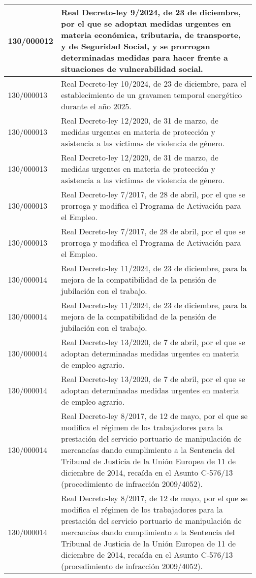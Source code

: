 {\begin{table}[H]
\begin{center}
\begin{tabularx}{\linewidth}{| l | X |}
\hline
130/000012 & Real Decreto-ley 9/2024, de 23 de diciembre, por el que se adoptan medidas urgentes en materia económica, tributaria, de transporte, y de Seguridad Social, y se prorrogan determinadas medidas para hacer frente a situaciones de vulnerabilidad social. \\
\hline
130/000013 & Real Decreto-ley 10/2024, de 23 de diciembre, para el establecimiento de un gravamen temporal energético durante el año 2025. \\
\hline
130/000013 & Real Decreto-ley 12/2020, de 31 de marzo, de medidas urgentes en materia de protección y asistencia a las víctimas de violencia de género. \\
\hline
130/000013 & Real Decreto-ley 12/2020, de 31 de marzo, de medidas urgentes en materia de protección y asistencia a las víctimas de violencia de género. \\
\hline
130/000013 & Real Decreto-ley 7/2017, de 28 de abril, por el que se prorroga y modifica el Programa de Activación para el Empleo. \\
\hline
130/000013 & Real Decreto-ley 7/2017, de 28 de abril, por el que se prorroga y modifica el Programa de Activación para el Empleo. \\
\hline
130/000014 & Real Decreto-ley 11/2024, de 23 de diciembre, para la mejora de la compatibilidad de la pensión de jubilación con el trabajo. \\
\hline
130/000014 & Real Decreto-ley 11/2024, de 23 de diciembre, para la mejora de la compatibilidad de la pensión de jubilación con el trabajo. \\
\hline
130/000014 & Real Decreto-ley 13/2020, de 7 de abril, por el que se adoptan determinadas medidas urgentes en materia de empleo agrario. \\
\hline
130/000014 & Real Decreto-ley 13/2020, de 7 de abril, por el que se adoptan determinadas medidas urgentes en materia de empleo agrario. \\
\hline
130/000014 & Real Decreto-ley 8/2017, de 12 de mayo, por el que se modifica el régimen de los trabajadores para la prestación del servicio portuario de manipulación de mercancías dando cumplimiento a la Sentencia del Tribunal de Justicia de la Unión Europea de 11 de diciembre de 2014, recaída en el Asunto C-576/13 (procedimiento de infracción 2009/4052). \\
\hline
130/000014 & Real Decreto-ley 8/2017, de 12 de mayo, por el que se modifica el régimen de los trabajadores para la prestación del servicio portuario de manipulación de mercancías dando cumplimiento a la Sentencia del Tribunal de Justicia de la Unión Europea de 11 de diciembre de 2014, recaída en el Asunto C-576/13 (procedimiento de infracción 2009/4052). \\

\end{tabularx}
\end{center}
\end{table}}

